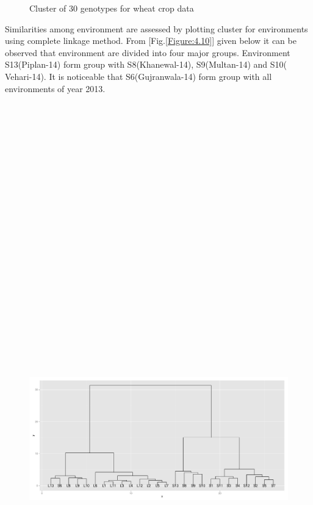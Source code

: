 \begin{figure} [H]
	\caption[Cluster analysis of genotypes]{Cluster of 30 genotypes for wheat crop data}
\label{Figure:4.9}
\end{figure}


Similarities among environment are assessed by plotting cluster for environments using complete linkage method. From [Fig.\ref{Figure:4.10}] given below it can be observed that environment are divided into four major groups. Environment S13(Piplan-14) form group with S8(Khanewal-14), S9(Multan-14) and S10( Vehari-14). It is noticeable that S6(Gujranwala-14) form group with all environments of year 2013.
\begin{figure} [H]
	\centering  
	\scalebox{0.34}
	{\includegraphics[width=20in,height=20in]{02ThesisMain/Ch04RD/figures/environment-cluster}}

\end{figure}
